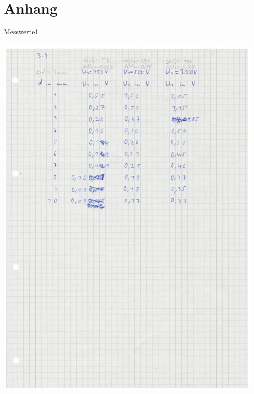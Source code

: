 \chapter{Anhang}
\begin{table}[h]
    \centering
    \caption[Messwerte1]{Messwerte1}
    \includegraphics[height=.75\textheight]{messungen/messwerte1.jpg}
    \label{tab:mess1}
\end{table}
%
